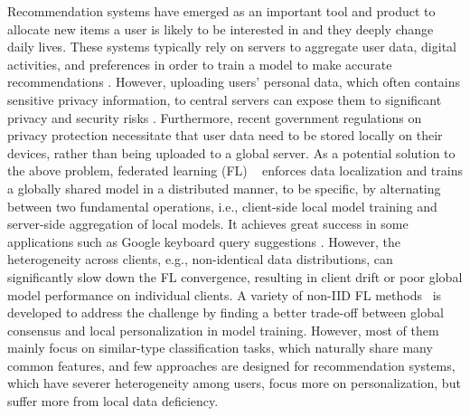 \documentclass{article} %
\begin{document}
Recommendation systems have emerged as an important tool and product to allocate new items a user is likely to be interested in and they deeply change daily lives. 
These systems typically rely on servers to aggregate user data, digital activities, and preferences in order to train a model to make accurate recommendations \citep{das2017survey}. However, uploading users' personal data, which often contains sensitive privacy information, to central servers can expose them to significant privacy and security risks \citep{chai2020secure}. Furthermore, recent government regulations on privacy protection \citep{voigt2017eu} necessitate that user data need to be stored locally on their devices, rather than being uploaded to a global server.
As a potential solution to the above problem, federated learning (FL) ~\citep{mcmahan2017communication} enforces data localization and trains a globally shared model in a distributed manner, to be specific, by alternating between two fundamental operations, i.e., client-side local model training and server-side aggregation of local models. It achieves great success in some applications such as Google keyboard query suggestions \citep{hard2018federated,yang2018applied,chen2019federated}. However, the heterogeneity across clients, e.g., non-identical data distributions, can significantly slow down the FL convergence, resulting in client drift or poor global model performance on individual clients. A variety of non-IID FL methods~\citep{zhao2018federated,li2020federated,pmlr-v119-karimireddy20a} is developed to address the challenge by finding a better trade-off between global consensus and local personalization in model training. However, most of them mainly focus on similar-type classification tasks, which naturally share many common features, and few approaches are designed for recommendation systems, which have severer heterogeneity among users, focus more on personalization, but suffer more from local data deficiency. 
\end{document}
